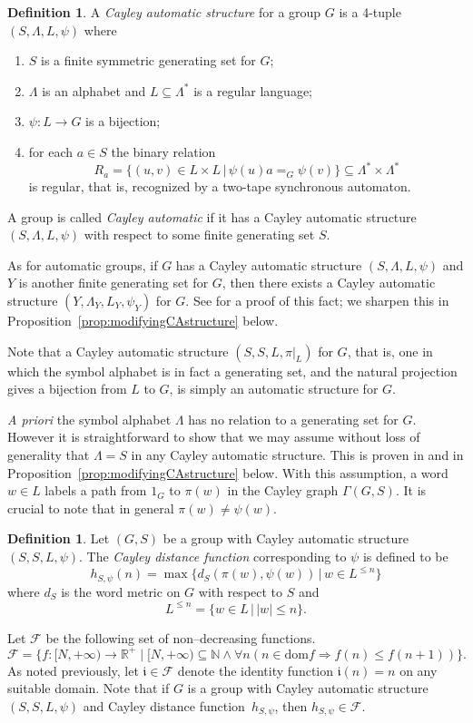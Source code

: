 \documentclass[11pt]{amsart}
\newcommand{\be}{\begin{enumerate}}
\newcommand{\ee}{\end{enumerate}}
\theoremstyle{definition}
\newtheorem{definition}[theorem]{Definition}
\newcommand\N{\mathbb N}
\newcommand\Rplus{\mathbb R^+}
\newcommand\distfun{Cayley distance function}
\newcommand\F{\mathcal F}
\begin{document}
\begin{definition}
\label{def:Caut}
A {\em Cayley automatic structure} for a group  $G$ is a 4-tuple  $(S,\Lambda, L,\psi)$ where
\be
\item $S$ is a finite symmetric generating set for $G$;
\item  $\Lambda$ is an alphabet and
 $L \subseteq \Lambda^*$  is a regular
language;
\item
$\psi\colon L \rightarrow G$ is a bijection;
\item
for each $a \in S$
the binary relation
$$R_a = \{(u,v) \in L \times L \,
|\,\psi(u)a=_G\psi(v)\} \subseteq \Lambda^* \times \Lambda^*$$
is regular, that is, recognized by
a two-tape synchronous automaton. \ee

A group is called {\em Cayley automatic} if it has a Cayley automatic structure   $(S,\Lambda, L,\psi)$  with respect to some finite generating set $S$.\end{definition}
As for automatic groups, if $G$ has a  Cayley automatic structure    $(S,\Lambda, L,\psi)$
and $Y$ is another finite generating set for $G$, then there exists a Cayley automatic structure    $(Y,\Lambda_Y, L_Y,\psi_Y)$ for $G$. See \cite[Theorem 6.9]{KKMjournal} for a proof of this fact; we sharpen this in Proposition~\ref{prop:modifyingCAstructure} below.


Note that a Cayley automatic structure $(S,S,L,\pi|_L)$ for $G$, that is, one in which the symbol alphabet is in fact a generating set, and the natural projection gives a bijection from $L$ to $G$, is simply an automatic structure for $G$.

{\em A priori} the symbol alphabet $\Lambda$ has no relation to a generating set for $G$.
However it is straightforward to show that we may assume without loss of generality that $\Lambda=S$ in any Cayley automatic structure.  This is proven in \cite{measuringcloseness} and in Proposition~\ref{prop:modifyingCAstructure} below.
With this assumption, a word $w\in L$ labels a path from $1_G$ to $\pi(w)$ in the Cayley graph $\Gamma(G,S)$.
It is crucial to note that in general $\pi(w)\neq \psi(w)$.



\begin{definition}
\label{def:h}
Let $(G,S)$ be a group with Cayley automatic structure $(S,S, L,\psi)$.  The {\em \distfun}  corresponding to $\psi$ is defined to be
$$ h_{S,\psi}(n) = \max \{ d_S (\pi (w),\psi(w)) \,| \, w \in L^{\leqslant n}\}$$
where $d_S$ is the word  metric on $G$ with respect to $S$ and
$$L^{\leqslant n} = \{ w \in L \, |\, |w|\leqslant n\}.$$
\end{definition}
Let $ \F$ be the following set of non–decreasing functions.
\[ \F=\{f :[N,+\infty)\to \Rplus \mid [N,+\infty)\subseteq \N\wedge \forall n (n\in \mathrm{dom} f \Rightarrow f(n)\leq f(n+1))\}.\]
As noted previously, let $ \mathfrak{i}\in  \F$ denote the identity function $ \mathfrak{i}(n)=n$ on any suitable domain.
Note that if
$G$ is a group with Cayley automatic structure $(S,S,L,\psi)$ and \distfun\ $h_{S,\psi}$, then  $h_{S,\psi}\in \F$.
\end{document}
